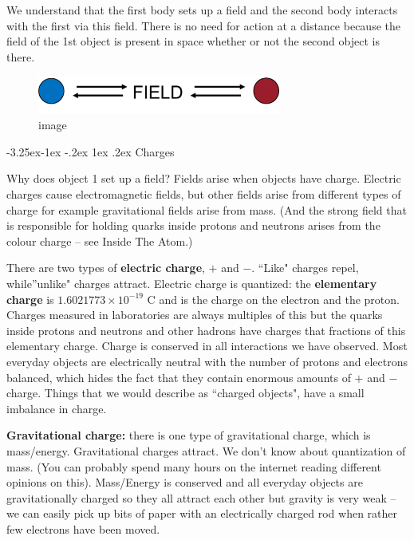 \documentclass[
]{book}
\makeatletter
\renewcommand\subsection{%
\@startsection{subsection}{2}{\z@}%
              {-3.25ex\@plus -1ex \@minus -.2ex}%
              {1ex \@plus .2ex}%
              {\sffamily\bfseries}}
\numberwithin{equation}{section}
\makeatother
\begin{document}
We understand that the first body sets up a field and the second body
interacts with the first via this field. There is no need for action at
a distance because the field of the 1st object is present in space
whether or not the second object is there.

\begin{figure}
\centering
\includegraphics[width=80mm,height=\textheight]{Figures/blue_red_FIELD.png}
\caption{image}
\end{figure}

\hypertarget{charges}{%
\subsection{Charges}\label{charges}}

Why does object 1 set up a field? Fields arise when objects have charge.
Electric charges cause electromagnetic fields, but other fields arise
from different types of charge for example gravitational fields arise
from mass. (And the strong field that is responsible for holding quarks
inside protons and neutrons arises from the colour charge -- see Inside
The Atom.)

There are two types of \textbf{electric charge}, \(+\) and \(-\). ``Like" charges
repel, while''unlike" charges attract. Electric charge is quantized:
the \textbf{elementary charge} is \(1.6021773 \times 10^{-19}\) C and is the
charge on the electron and the proton. Charges measured in laboratories
are always multiples of this but the quarks inside protons and neutrons
and other hadrons have charges that fractions of this elementary charge.
Charge is conserved in all interactions we have observed. Most everyday
objects are electrically neutral with the number of protons and
electrons balanced, which hides the fact that they contain enormous
amounts of \(+\) and \(-\) charge. Things that we would describe as ``charged
objects", have a small imbalance in charge.

\textbf{Gravitational charge:} there is one type of gravitational charge,
which is mass/energy. Gravitational charges attract. We don't know about
quantization of mass. (You can probably spend many hours on the internet
reading different opinions on this). Mass/Energy is conserved and all
everyday objects are gravitationally charged so they all attract each
other but gravity is very weak -- we can easily pick up bits of paper
with an electrically charged rod when rather few electrons have been
moved.
\end{document}
